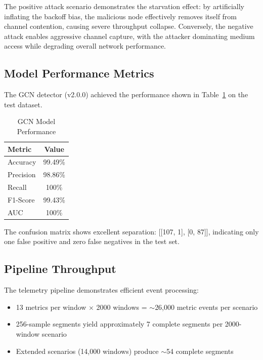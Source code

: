 \documentclass[conference]{IEEEtran}
\begin{document}
The positive attack scenario demonstrates the starvation effect: by artificially inflating the backoff bias, the malicious node effectively removes itself from channel contention, causing severe throughput collapse. Conversely, the negative attack enables aggressive channel capture, with the attacker dominating medium access while degrading overall network performance.

\subsection{Model Performance Metrics}

The GCN detector (v2.0.0) achieved the performance shown in Table~\ref{tab:model-performance} on the test dataset.

\begin{table}[htbp]
\caption{GCN Model Performance}
\label{tab:model-performance}
\centering
\begin{tabular}{|l|c|}
\hline
\textbf{Metric} & \textbf{Value} \\
\hline
Accuracy & 99.49\% \\
Precision & 98.86\% \\
Recall & 100\% \\
F1-Score & 99.43\% \\
AUC & 100\% \\
\hline
\end{tabular}
\end{table}

The confusion matrix shows excellent separation: [[107, 1], [0, 87]], indicating only one false positive and zero false negatives in the test set.

\subsection{Pipeline Throughput}

The telemetry pipeline demonstrates efficient event processing:

\begin{itemize}
    \item 13 metrics per window $\times$ 2000 windows = $\sim$26,000 metric events per scenario
    \item 256-sample segments yield approximately 7 complete segments per 2000-window scenario
    \item Extended scenarios (14,000 windows) produce $\sim$54 complete segments
\end{itemize}
\end{document}
